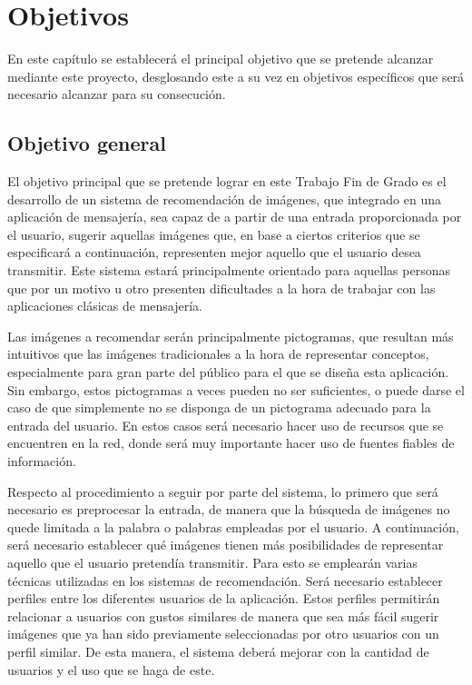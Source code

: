 \chapter{Objetivos}
\label{chap:objetivos}

\noindent
En este capítulo se establecerá el principal objetivo que se pretende alcanzar mediante este proyecto, desglosando este a su vez en objetivos específicos que será necesario alcanzar para su consecución.

\section{Objetivo general}

El objetivo principal que se pretende lograr en este Trabajo Fin de Grado es el desarrollo de un sistema de recomendación de imágenes, que integrado en una aplicación de mensajería, sea capaz de a partir de una entrada proporcionada por el usuario, sugerir aquellas imágenes que, en base a ciertos criterios que se especificará a continuación, representen mejor aquello que el usuario desea transmitir. Este sistema estará principalmente orientado para aquellas personas que por un motivo u otro presenten dificultades a la hora de trabajar con las aplicaciones clásicas de mensajería.

Las imágenes a recomendar serán principalmente pictogramas, que resultan más intuitivos que las imágenes tradicionales a la hora de representar conceptos, especialmente para gran parte del público para el que se diseña esta aplicación. Sin embargo, estos pictogramas a veces pueden no ser suficientes, o puede darse el caso de que simplemente no se disponga de un pictograma adecuado para la entrada del usuario. En estos casos será necesario hacer uso de recursos que se encuentren en la red, donde será muy importante hacer uso de fuentes fiables de información.

Respecto al procedimiento a seguir por parte del sistema, lo primero que será necesario es preprocesar la entrada, de manera que la búsqueda de imágenes no quede limitada a la palabra o palabras empleadas por el usuario. A continuación, será necesario establecer qué imágenes tienen más posibilidades de representar aquello que el usuario pretendía transmitir. Para esto se emplearán varias técnicas utilizadas en los sistemas de recomendación. Será necesario establecer perfiles entre los diferentes usuarios de la aplicación. Estos perfiles permitirán relacionar a usuarios con gustos similares de manera que sea más fácil sugerir imágenes que ya han sido previamente seleccionadas por otro usuarios con un perfil similar. De esta manera, el sistema deberá mejorar con la cantidad de usuarios y el uso que se haga de este.

